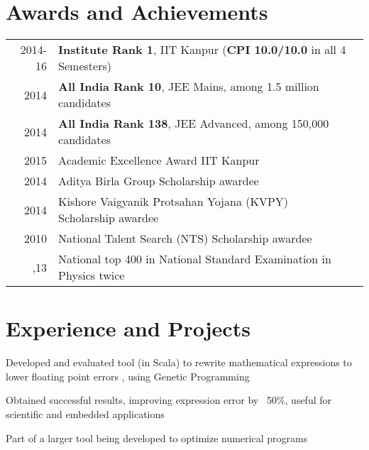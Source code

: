 \documentclass[a4paper]{deedy-resume} %
\newcommand{\onepage}[1]{
  \ifdefined\onep
  #1
  \fi
}
\begin{document}
\begin{minipage}[t]{0.66\textwidth}

  \section{Awards and Achievements}

  \begin{tabular}{rll}
    2014-16	 & \textbf{Institute Rank 1}, IIT Kanpur (\textbf{CPI 10.0/10.0} in all 4 Semesters)\\
    2014	 & \textbf{All India Rank 10}, JEE Mains, among 1.5 million candidates\\
    2014	 & \textbf{All India Rank 138}, JEE Advanced, among 150,000 candidates\\
    2015	 & Academic Excellence Award IIT Kanpur\\
    2014   & Aditya Birla Group Scholarship awardee\\
    2014   & Kishore Vaigyanik Protsahan Yojana (KVPY) Scholarship awardee\\
    2010   & National Talent Search (NTS) Scholarship awardee\\
    \onepage{2012,13 & National top 400 in National Standard
                       Examination in Physics twice}
  \end{tabular}

  \sectionspace


  \section{Experience and Projects}

  \runsubsection{}
   
  \vspace{\topsep}
  \begin{tightitemize}
  \item Developed and evaluated tool (in Scala) to rewrite
    mathematical expressions to lower floating point errors\onepage{, using
      Genetic Programming}
  \item	Obtained successful results, improving expression error by
    ~50\%, useful for scientific and embedded applications
  \item Part of a larger tool being developed to optimize numerical
    programs
  \end{tightitemize}

  \sectionspace


\end{minipage}
\end{document}
